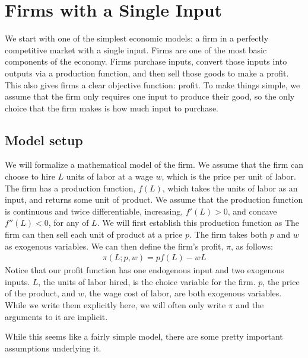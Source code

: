 \chapter{Firms with a Single Input}
We start with one of the simplest economic models: a firm in a perfectly competitive market with a single input. Firms are one of the most basic components of the economy. Firms purchase inputs, convert those inputs into outputs via a production function, and then sell those goods to make a profit. This also gives firms a clear objective function: profit. To make things simple, we assume that the firm only requires one input to produce their good, so the only choice that the firm makes is how much input to purchase. 

\section{Model setup}
We will formalize a mathematical model of the firm. We assume that the firm can choose to hire $L$ units of labor at a wage $w$, which is the price per unit of labor. The firm has a production function, $f(L)$, which takes the units of labor as an input, and returns some unit of product. We assume that the production function is continuous and twice differentiable, increasing, $f'(L) > 0$, and concave $f''(L) < 0$, for any of $L$. We will first establish this production function as The firm can then sell each unit of product at a price $p$. The firm takes both $p$ and $w$ as exogenous variables. We can then define the firm's profit, $\pi$, as follows:
\begin{align}
    \pi(L; p, w) = p f(L) - w L \label{eq:profit_def}
\end{align}
Notice that our profit function has one endogenous input and two exogenous inputs. $L$, the units of labor hired, is the choice variable for the firm. $p$, the price of the product, and $w$, the wage cost of labor, are both exogenous variables. While we write them explicitly here, we will often only write $\pi$ and the arguments to it are implicit. 

While this seems like a fairly simple model, there are some pretty important assumptions underlying it.

